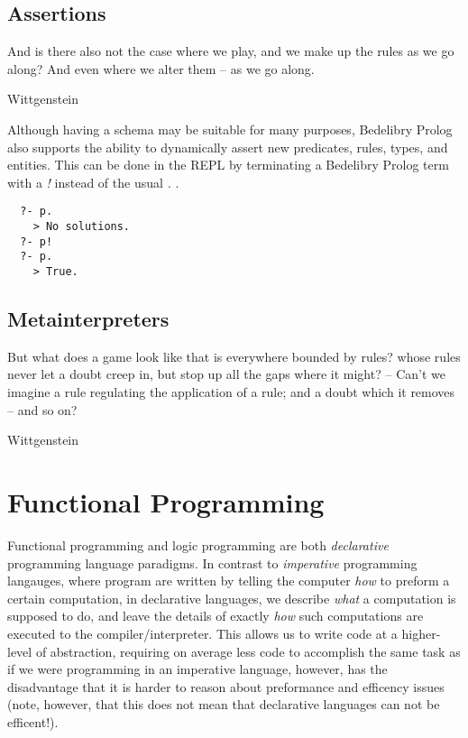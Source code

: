 \documentclass{book}
\begin{document}
\section{Assertions}
\epigraph{And is there also not the case where we play, and we make up the rules as we go along? And even where we alter them -- as we go along.}{Wittgenstein}

Although having a schema may be suitable for many purposes, Bedelibry Prolog also supports the ability to dynamically assert new predicates, rules, types, and entities. This can be done in the REPL by terminating a Bedelibry Prolog term with a \textit{!} instead of the usual \textit{.} .

\begin{verbatim}
  ?- p.
    > No solutions.
  ?- p!
  ?- p.
    > True.
\end{verbatim}

\section{Metainterpreters}

\epigraph{But what does a game look like that is everywhere bounded by rules? whose rules never let a doubt creep in, but stop up all the gaps where it might? -- Can't we imagine a rule regulating the application of a rule; and a doubt which it removes -- and so on?}{Wittgenstein}



\chapter{Functional Programming}

Functional programming and logic programming are both \textit{declarative} programming language paradigms. In contrast to \textit{imperative} programming langauges, where program are written by telling the computer \textit{how} to preform a certain computation, in declarative languages, we describe \textit{what} a computation is supposed to do, and leave the details of exactly \textit{how} such computations are executed to the compiler/interpreter. This allows us to write code at a higher-level of abstraction, requiring on average less code to accomplish the same task as if we were programming in an imperative language, however, has the disadvantage that it is harder to reason about preformance and efficency issues (note, however, that this does not mean that declarative languages can not be efficent!).
\end{document}
